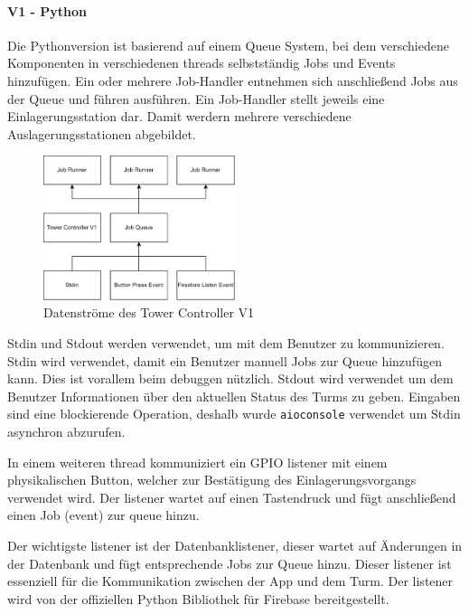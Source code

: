 \paragraph{V1 - Python}
Die Pythonversion ist basierend auf einem Queue System, bei dem verschiedene Komponenten in verschiedenen \Glspl{thread} selbstständig Jobs und Events hinzufügen. Ein oder mehrere Job-Handler entnehmen sich anschließend Jobs aus der Queue und führen ausführen. Ein Job-Handler stellt jeweils eine Einlagerungsstation dar. Damit werdern mehrere verschiedene Auslagerungsstationen abgebildet.

\begin{figure}[H]
  \centering
  \includegraphics[width=0.5\textwidth]{images/tower_controller_v1.png}
  \caption{Datenströme des Tower Controller V1}
  \label{fig:tower_controller_v1}
\end{figure}

\ac{Stdin} und \ac{Stdout} werden verwendet, um mit dem Benutzer zu kommunizieren. \ac{Stdin} wird verwendet, damit ein Benutzer manuell Jobs zur Queue hinzufügen kann. Dies ist vorallem beim \Gls{debuggen} nützlich. \ac{Stdout} wird verwendet um dem Benutzer Informationen über den aktuellen Status des Turms zu geben. Eingaben sind eine blockierende Operation, deshalb wurde \texttt{aioconsole} verwendet um \ac{Stdin} asynchron abzurufen.

\bigskip

\noindent In einem weiteren \Gls{thread} kommuniziert ein \ac{GPIO} \Gls{listener} mit einem physikalischen Button, welcher zur Bestätigung des Einlagerungsvorgangs verwendet wird. Der \Gls{listener} wartet auf einen Tastendruck und fügt anschließend einen Job (\Gls{event}) zur \Gls{queue} hinzu.

\bigskip

\noindent Der wichtigste \Gls{listener} ist der Datenbanklistener, dieser wartet auf Änderungen in der Datenbank und fügt entsprechende Jobs zur Queue hinzu. Dieser \Gls{listener} ist essenziell für die Kommunikation zwischen der App und dem Turm. Der \Gls{listener} wird von der offiziellen Python Bibliothek für Firebase bereitgestellt.

